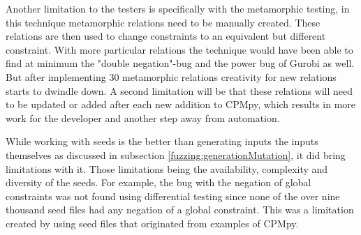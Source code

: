 Another limitation to the testers is specifically with the metamorphic testing, in this technique metamorphic relations need to be manually created. These relations are then used to change constraints to an equivalent but different constraint. With more particular relations the technique would have been able to find at minimum the "double negation"-bug and the power bug of Gurobi as well. But after implementing 30 metamorphic relations creativity for new relations starts to dwindle down. A second limitation will be that these relations will need to be updated or added after each new addition to CPMpy, which results in more work for the developer and another step away from automation.


While working with seeds is the better than generating inputs the inputs themselves as discussed in subsection \ref{fuzzing:generationMutation}, it did bring limitations with it. Those limitations being the availability, complexity and diversity of the seeds. For example, the bug with the negation of global constraints was not found using differential testing since none of the over nine thousand seed files had any negation of a global constraint. This was a limitation created by using seed files that originated from examples of CPMpy.





